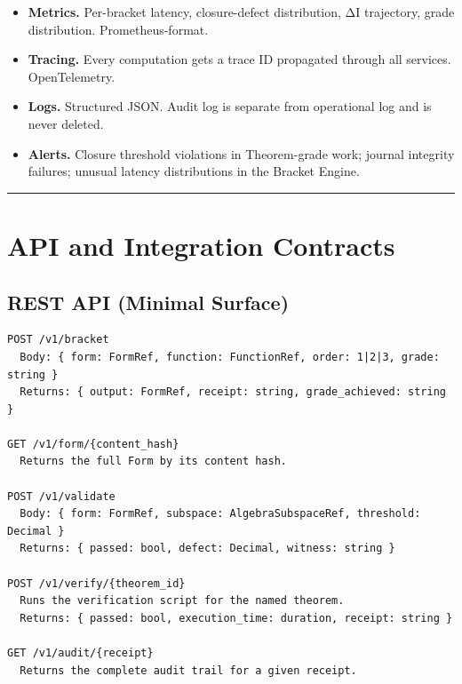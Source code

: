 \documentclass[11pt,a4paper]{article}
\providecommand{\tightlist}{\setlength{\itemsep}{0pt}\setlength{\parskip}{0pt}}
\begin{document}
\begin{itemize}
\tightlist
\item
  \textbf{Metrics.} Per-bracket latency, closure-defect distribution, ΔI
  trajectory, grade distribution. Prometheus-format.
\item
  \textbf{Tracing.} Every computation gets a trace ID propagated through
  all services. OpenTelemetry.
\item
  \textbf{Logs.} Structured JSON. Audit log is separate from operational
  log and is never deleted.
\item
  \textbf{Alerts.} Closure threshold violations in Theorem-grade work;
  journal integrity failures; unusual latency distributions in the
  Bracket Engine.
\end{itemize}

\begin{center}\rule{0.5\linewidth}{0.5pt}\end{center}

\hypertarget{api-and-integration-contracts}{%
\section{API and Integration
Contracts}\label{api-and-integration-contracts}}

\hypertarget{rest-api-minimal-surface}{%
\subsection{REST API (Minimal Surface)}\label{rest-api-minimal-surface}}

\begin{Verbatim}[breaklines=true,breakanywhere=true]
POST /v1/bracket
  Body: { form: FormRef, function: FunctionRef, order: 1|2|3, grade: string }
  Returns: { output: FormRef, receipt: string, grade_achieved: string }

GET /v1/form/{content_hash}
  Returns the full Form by its content hash.

POST /v1/validate
  Body: { form: FormRef, subspace: AlgebraSubspaceRef, threshold: Decimal }
  Returns: { passed: bool, defect: Decimal, witness: string }

POST /v1/verify/{theorem_id}
  Runs the verification script for the named theorem.
  Returns: { passed: bool, execution_time: duration, receipt: string }

GET /v1/audit/{receipt}
  Returns the complete audit trail for a given receipt.
\end{Verbatim}
\end{document}
